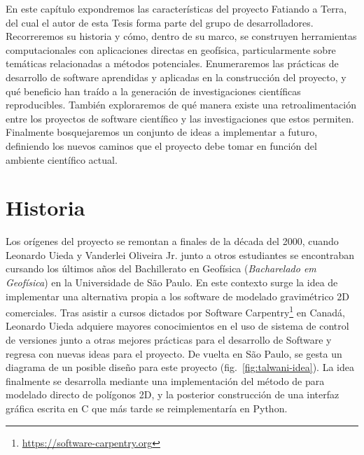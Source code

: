 En este capítulo expondremos las  características del proyecto
Fatiando a Terra, del cual el autor de esta Tesis forma parte del grupo de
desarrolladores.
Recorreremos su historia y cómo, dentro de su marco, se construyen herramientas
computacionales con aplicaciones directas en geofísica, particularmente sobre
temáticas relacionadas a métodos potenciales.
Enumeraremos las prácticas de desarrollo de software aprendidas y aplicadas en
la construcción del proyecto, y qué beneficio han traído a la generación de
investigaciones científicas reproducibles.
También exploraremos de qué manera existe una retroalimentación entre los
proyectos de software científico y las investigaciones que estos permiten.
Finalmente bosquejaremos un conjunto de ideas a implementar a futuro,
definiendo los nuevos caminos que el proyecto debe tomar en función del
ambiente científico actual.


\section{Historia}

Los orígenes del proyecto se remontan a finales de la década del 2000, cuando
Leonardo Uieda y Vanderlei Oliveira Jr. junto a otros estudiantes se
encontraban cursando los últimos años del Bachillerato en Geofísica
(\emph{Bacharelado em Geofísica}) en la Universidade de São Paulo.
En este contexto surge la idea de implementar una alternativa propia a los
software de modelado gravimétrico 2D comerciales.
Tras asistir a cursos dictados por
Software Carpentry\footnote{%
    \url{https://software-carpentry.org}
}
en Canadá, Leonardo Uieda adquiere mayores conocimientos en el uso de sistema
de control de versiones junto a otras mejores prácticas para el desarrollo de
Software y regresa con nuevas ideas para el proyecto.
De vuelta en São Paulo, se gesta un diagrama de un posible diseño para este
proyecto (fig.~\ref{fig:talwani-idea}).
La idea finalmente se desarrolla mediante una implementación del método de
\citet{talwani1959} para modelado directo de polígonos 2D, y la posterior
construcción de una interfaz gráfica escrita en C que más tarde se
reimplementaría en Python.

